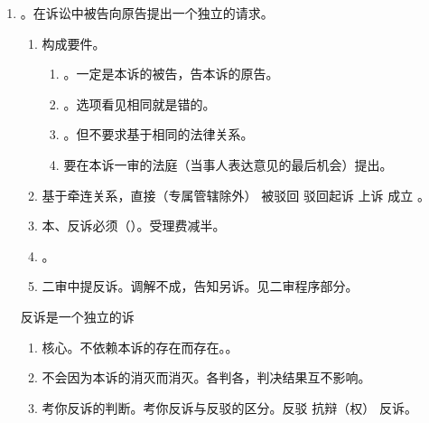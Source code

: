 \begin{enumerate}
\begin{enumerate}
\begin{kk}{小 Tips}
\begin{enumerate}
                    \item 诉的分类的前提是诉及诉讼案件，非讼案件不讨论诉的分类。考试经常用非讼程序干扰你。
                    \item 分类唯一依据是原告请求，与被告的答辩意见无关，是干扰信息。
                    \item 考试最简单的是变客体，然后主体、内容变来变去。
                  \end{enumerate}
                \end{kk}
        \end{enumerate}
  \item {}。在诉讼中被告向原告提出一个独立的请求。
        \begin{enumerate}
          \item 构成要件。
                \begin{enumerate}
                  \item {}。一定是本诉的被告，告本诉的原告。
                  \item {}。选项看见相同就是错的。
                  \item {}。但不要求基于相同的法律关系。
                  \item 要在本诉一审的法庭（当事人表达意见的最后机会）提出。
                \end{enumerate}
          \item 基于牵连关系，直接（专属管辖除外）
                \yjt 被驳回 \ydy 驳回起诉 \yjt 上诉 \yjt 成立 \yjt {}。
          \item 本、反诉必须（）。受理费减半。
          \item {}。
          \item 二审中提反诉。调解不成，告知另诉。见二审程序部分。
        \end{enumerate}
        \begin{kk}{反诉是一个独立的诉}
          \begin{enumerate}
            \item 核心。不依赖本诉的存在而存在。。
            \item 不会因为本诉的消灭而消灭。各判各，判决结果互不影响。
            \item 考你反诉的判断。考你反诉与反驳的区分。反驳 \bdy 抗辩（权） \bdy 反诉。

\end{enumerate}
\end{kk}
\end{enumerate}
